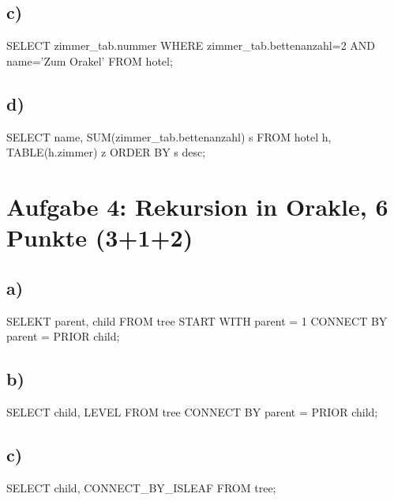 \documentclass[12pt]{scrreprt}
\begin{document}
\subsection*{c)}
SELECT zimmer\_tab.nummer \newline
\hspace*{5mm}WHERE zimmer\_tab.bettenanzahl=2\newline
\hspace*{5mm}AND name='Zum Orakel'\newline
\hspace*{5mm}FROM hotel;\newline
\subsection*{d)}
SELECT name, SUM(zimmer\_tab.bettenanzahl) s FROM hotel h,\newline
\hspace*{5mm}TABLE(h.zimmer) z ORDER BY s desc;

\section*{Aufgabe 4: Rekursion in Orakle, 6 Punkte (3+1+2)}
\subsection*{a)}
SELEKT parent, child FROM tree\newline
\hspace*{5mm}START WITH parent = 1\newline
\hspace*{5mm}CONNECT BY parent = PRIOR child;\newline
\subsection*{b)}
SELECT child, LEVEL FROM tree\newline
\hspace*{5mm}CONNECT BY parent = PRIOR child;\newline
\subsection*{c)}
SELECT child, CONNECT\_BY\_ISLEAF\newline
\hspace*{5mm}FROM tree;
\end{document}
